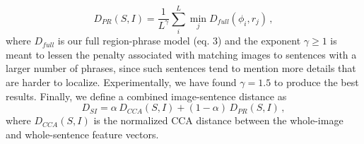 \documentclass[twocolumn]{svjour3}
\begin{document}
\begin{equation}\label{dis_ave}
  D_{PR}(S,I) = \frac{1}{L^\gamma} \sum_{i}^L \min_j D_{full}(\phi_i,r_j) \, ,
\end{equation}
where $D_{full}$ is our full region-phrase model (eq. 3) and the exponent $\gamma \ge 1$ is meant to lessen the penalty associated with matching images to sentences with a larger number of phrases, since such sentences tend to mention more details that are harder to localize. Experimentally, we have found $\gamma = 1.5$ to produce the best results. Finally, we define a combined image-sentence distance as 
\begin{equation}\label{dis}
D_{SI} = \alpha\, {D}_{CCA}(S,I) +  (1-\alpha)\,D_{PR}(S,I) \,,
\end{equation}
where $D_{CCA}(S,I)$ is the normalized CCA distance between the whole-image and whole-sentence feature vectors.
\end{document}

